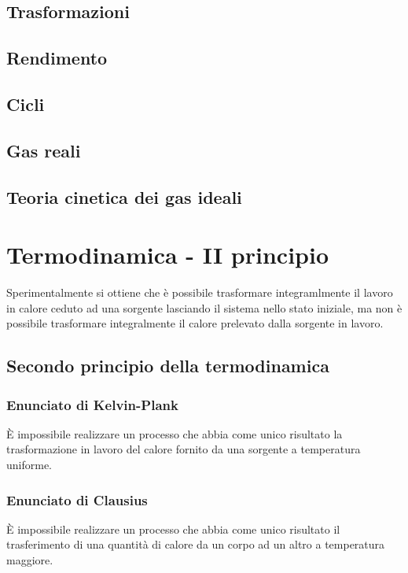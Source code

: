 \documentclass[x11names]{report}
\begin{document}
	\section{Trasformazioni}
	\section{Rendimento}
	\section{Cicli}
	\section{Gas reali}
	\section{Teoria cinetica dei gas ideali}
	
	
	
	\chapter{Termodinamica - II principio}
	Sperimentalmente si ottiene che è possibile trasformare integramlmente il lavoro in calore ceduto ad una sorgente lasciando il sistema nello stato iniziale, ma non è possibile trasformare integralmente il calore prelevato dalla sorgente in lavoro.
	
	\section{Secondo principio della termodinamica}
	\begin{center}
		\colorbox{yred}{\begin{minipage}{5.75in}
				\begin{redes}{}
					\subsection{Enunciato di Kelvin-Plank}
					È impossibile realizzare un processo che abbia come unico risultato la trasformazione in lavoro del calore fornito da una sorgente a temperatura uniforme.
					\vspace{0.2cm}
					\subsection{Enunciato di Clausius}
					È impossibile realizzare un processo che abbia come unico risultato il trasferimento di una quantità di calore da un corpo ad un altro a temperatura maggiore.
				\end{redes}
		\end{minipage}}
	\end{center}
	
\end{document}
